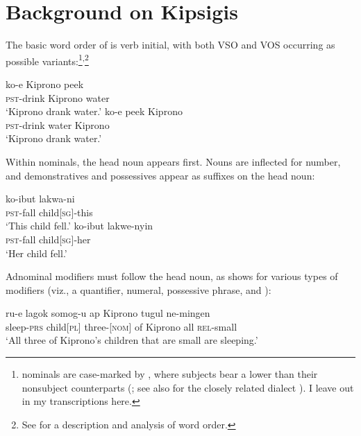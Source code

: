 \documentclass[output=paper]{LSP/langsci}
\begin{document}
\section{Background on Kipsigis}\label{sec:landman:background} 

The basic word order of  is verb initial, with both VSO and VOS occurring as possible variants:\footnote{ nominals are case-marked by , where subjects bear a lower  than their nonsubject counterparts (\citealt{Jake:1979}; see also \citealt{Creider:1989,Creider:2003} for the closely related dialect ). I leave out  in my transcriptions here.}\textsuperscript{,}\footnote{See \citealt{Diercks:2016b} for a description and analysis of  word order.} 

\ea
  \ea \gll	ko-e Kiprono peek\\
			\textsc{pst}-drink Kiprono water\\ 
      \glt ‘Kiprono drank water.’\label{ex:landman:VSO}
  \ex \gll ko-e peek Kiprono\\
           \textsc{pst}-drink water Kiprono\\ 
      \glt ‘Kiprono drank water.’\label{ex:landman:VOS}
  \z
\z
 
Within nominals, the head noun appears first. Nouns are inflected for number, and demonstratives  and possessives  appear as suffixes on the head noun:

\ea
  \settowidth{}  
  \ea \label{ex:landman:6a}
    \gll ko-ibut lakwa-ni \\
      \textsc{pst}-fall child[\textsc{sg}]-this\\                 
      \glt ‘This child fell.’
  \ex\label{ex:landman:6b}
    \gll ko-ibut lakwe-nyin \\
      \textsc{pst}-fall child[\textsc{sg}]-her\\                   
      \glt ‘Her child fell.’
  \z
\z 

\noindent Adnominal modifiers must follow the head noun, as  shows for various types of modifiers (viz., a quantifier, numeral, possessive phrase, and ): 

\ea \label{ex:landman:7a}
  \gll ru-e lagok somog-u ap Kiprono tugul ne-mingen\\
       sleep-\textsc{prs} child[\textsc{pl}] three-[\textsc{nom}] of Kiprono all \textsc{rel}-small\\
  \glt ‘All three of Kiprono's children that are small are sleeping.’
\z
\end{document}
